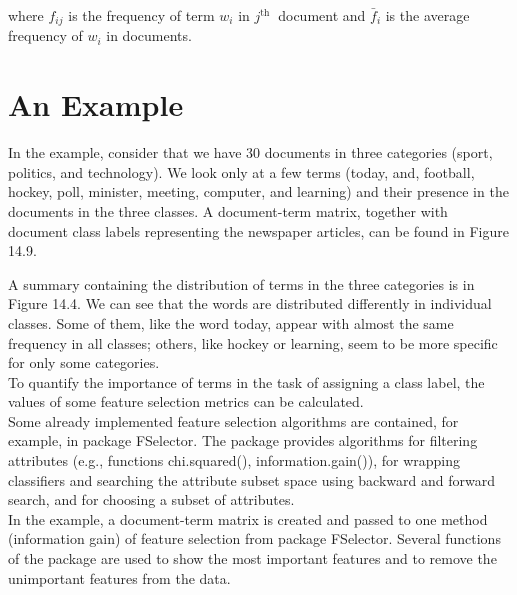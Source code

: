 where $f_{i j}$ is the frequency of term $w_{i}$ in $j^{\text {th }}$ document and $\bar{f}_{i}$ is the average frequency of $w_{i}$ in documents.

\section{An Example}
In the example, consider that we have 30 documents in three categories (sport, politics, and technology). We look only at a few terms (today, and, football, hockey, poll, minister, meeting, computer, and learning) and their presence in the documents in the three classes. A document-term matrix, together with document class labels representing the newspaper articles, can be found in Figure 14.9.

A summary containing the distribution of terms in the three categories is in Figure 14.4. We can see that the words are distributed differently in individual classes. Some of them, like the word today, appear with almost the same frequency in all classes; others, like hockey or learning, seem to be more specific for only some categories.\\[0.1cm]
To quantify the importance of terms in the task of assigning a class label, the values of some feature selection metrics can be calculated.\\[0.1cm]
Some already implemented feature selection algorithms are contained, for example, in package FSelector. The package provides algorithms for filtering attributes (e.g., functions chi.squared(), information.gain()), for wrapping classifiers and searching the attribute subset space using backward and forward search, and for choosing a subset of attributes.\\[0.1cm]
In the example, a document-term matrix is created and passed to one method (information gain) of feature selection from package FSelector. Several functions of the package are used to show the most important features and to remove the unimportant features from the data.

